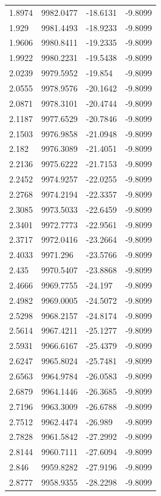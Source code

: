 \begin{table}[H]
\begin{tabular}{llll}
1.8974 & 9982.0477 & -18.6131 & -9.8099 \\
1.929 & 9981.4493 & -18.9233 & -9.8099 \\
1.9606 & 9980.8411 & -19.2335 & -9.8099 \\
1.9922 & 9980.2231 & -19.5438 & -9.8099 \\
2.0239 & 9979.5952 & -19.854 & -9.8099 \\
2.0555 & 9978.9576 & -20.1642 & -9.8099 \\
2.0871 & 9978.3101 & -20.4744 & -9.8099 \\
2.1187 & 9977.6529 & -20.7846 & -9.8099 \\
2.1503 & 9976.9858 & -21.0948 & -9.8099 \\
2.182 & 9976.3089 & -21.4051 & -9.8099 \\
2.2136 & 9975.6222 & -21.7153 & -9.8099 \\
2.2452 & 9974.9257 & -22.0255 & -9.8099 \\
2.2768 & 9974.2194 & -22.3357 & -9.8099 \\
2.3085 & 9973.5033 & -22.6459 & -9.8099 \\
2.3401 & 9972.7773 & -22.9561 & -9.8099 \\
2.3717 & 9972.0416 & -23.2664 & -9.8099 \\
2.4033 & 9971.296 & -23.5766 & -9.8099 \\
2.435 & 9970.5407 & -23.8868 & -9.8099 \\
2.4666 & 9969.7755 & -24.197 & -9.8099 \\
2.4982 & 9969.0005 & -24.5072 & -9.8099 \\
2.5298 & 9968.2157 & -24.8174 & -9.8099 \\
2.5614 & 9967.4211 & -25.1277 & -9.8099 \\
2.5931 & 9966.6167 & -25.4379 & -9.8099 \\
2.6247 & 9965.8024 & -25.7481 & -9.8099 \\
2.6563 & 9964.9784 & -26.0583 & -9.8099 \\
2.6879 & 9964.1446 & -26.3685 & -9.8099 \\
2.7196 & 9963.3009 & -26.6788 & -9.8099 \\
2.7512 & 9962.4474 & -26.989 & -9.8099 \\
2.7828 & 9961.5842 & -27.2992 & -9.8099 \\
2.8144 & 9960.7111 & -27.6094 & -9.8099 \\
2.846 & 9959.8282 & -27.9196 & -9.8099 \\
2.8777 & 9958.9355 & -28.2298 & -9.8099 \\

\end{tabular}
\end{table}
